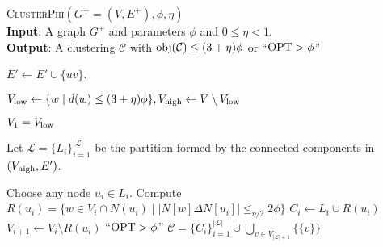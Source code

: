  
\begin{algorithm}[t]
\caption{{\textsc{ClusterPhi}}$(G^+=(V, E^+), \phi, \eta)$\label{alg:main}\\
\textbf{Input}: A graph $G^{+}$ and parameters $\phi$ and $0 \leq \eta < 1$. \\
\textbf{Output}: A clustering $\mathcal{C}$ with $\mathrm{obj}(\mathcal{C})\leq (3+\eta)\phi$ or ``$\mathrm{OPT} > \phi$''}
\label{alg:lp}
\begin{algorithmic}[1]


     \label{ln:highdegstart}
            \State $E' \leftarrow E' \cup \{uv\}$.
        \EndIf
     \EndFor
    
    \State $V_{\operatorname{low}} \leftarrow \{w \mid \mbox{$d(w) \leq (3+\eta) \phi$} \}, V_{\operatorname{high}} \leftarrow V \setminus V_{\operatorname{low}}$

    \State $V_1 = V_{\operatorname{low}}$
    
    \State Let $\mathcal{L} = \{L_i\}_{i=1}^{|\mathcal{L}|}$ be the partition formed by the connected components in $(V_{\operatorname{high}} ,E')$. \label{ln:highdegend}

     \label{ln:upper} 
    \State Choose any node $u_i \in L_i$.
    \State \label{ln:R}Compute $R(u_i) = \{ w \in V_i \cap N(u_i) \mid |N[w] \Delta N[u_i]| \leq_{\eta/2} 2\phi   \}$
    \State  \label{ln:C}$C_i \leftarrow L_i \cup R(u_i)$                                                  
    \State $V_{i + 1} \leftarrow V_i \setminus R(u_i)$
    \EndFor   \label{ln:lower} 
    \label{ln:checking}
    \State \Return ``$\mathrm{OPT} > \phi$'' 
    \Else
    \State \Return $\mathcal{C} = \{C_i\}_{i=1}^{|\mathcal{L}|} \cup \bigcup_{v \in V_{|\mathcal{L}|+1}}\{ \{v\} \}$
    \EndIf
\EndFunction
\end{algorithmic}
\end{algorithm}



